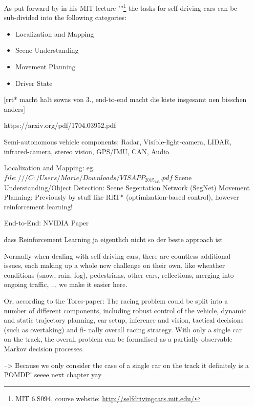 As put forward by  in his MIT lecture ""\footnote{MIT 6.S094, course website: \url{http://selfdrivingcars.mit.edu/}} the tasks for self-driving cars can be sub-divided into the following categories: 
\begin{itemize} \bfseries
	\item Localization and Mapping
	\item Scene Understanding
	\item Movement Planning
	\item Driver State
\end{itemize}
[rrt* macht halt sowas von 3., end-to-end macht die kiste insgesamt nen bisschen anders]


https://arxiv.org/pdf/1704.03952.pdf

Semi-autonomous vehicle components: Radar, Visible-light-camera, LIDAR, infrared-camera, stereo vision, GPS/IMU, CAN, Audio

Localization and Mapping: eg. $file:///C:/Users/Marie/Downloads/VISAPP_2015_145.pdf$
Scene Understanding/Object Detection: Scene Segentation Network (SegNet)
Movement Planning: Previously by stuff like RRT* (optimization-based control), however reinforcement learning!

End-to-End: NVIDIA Paper

dass Reinforcement Learning ja eigentlich nicht so der beste approach ist


Normally when dealing with self-driving cars, there are countless additional issues, each making up a whole new challenge on their own, like wheather conditions (snow, rain, fog), pedestrians, other cars, reflections, merging into ongoing traffic, ...
we make it easier here.

Or, according to the Torcs-paper:
The racing problem could be split into a number of different components, including
robust control of the vehicle, dynamic and static trajectory planning,
car setup, inference and vision, tactical decisions (such as overtaking) and fi-
nally overall racing strategy. With only a single car on the track, the overall
problem can be formalised as a partially observable Markov decision processes.



--> Because we only consider the case of a  single car on the track it definitely is a POMDP! seeee next chapter yay
